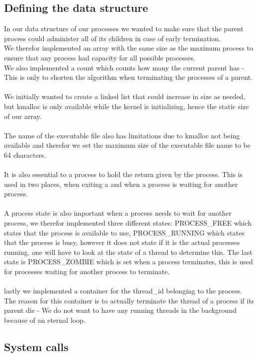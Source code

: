 \documentclass[a4paper,12pt,danish]{report}
\begin{document}
\subsection{Defining the data structure}
In our data structure of our processes we wanted to make sure that the parent process could administer all of its children in case of early termination.
\\
We therefor implemented an array with the same size as the maximum process to ensure that any process had capacity for all possible processes.
\\
We also implemented a count which counts how many the current parent has - This is only to shorten the algorithm when terminating the processes of a parent.
\\
\\
We initially wanted to create a linked list that could increase in size as needed, but kmalloc is only available while the kernel is initializing, hence the static size of our array.
\\
\\
The name of the executable file also has limitations due to kmalloc not being available and therefor we set the maximum size of the executable file name to be 64 characters.
\\
\\
It is also essential to a process to hold the return given by the process. This is used in two places, when exiting a and when a process is waiting for another process.
\\
\\
A process state is also important when a process needs to wait for another process, we therefor implemented three different states: PROCESS\_FREE which states that the process is available to use, PROCESS\_RUNNING which states that the process is busy, however it does not state if it is the actual processes running, one will have to look at the state of a thread to determine this. The last state is PROCESS\_ZOMBIE which is set when a process terminates, this is used for processes waiting for another process to terminate.
\\
\\
lastly we implemented a container for the thread\_id belonging to the process.
\\
The reason for this container is to actually terminate the thread of a process if its parent die - We do not want to have any running threads in the background because of an eternal loop.
\subsection{System calls}
\end{document}
